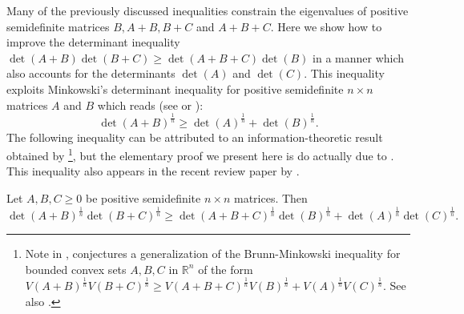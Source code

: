 \documentclass[notitlepage, 10pt]{article}
\begin{document}
Many of the previously discussed inequalities constrain the eigenvalues of positive semidefinite matrices $B, A+B, B+C$ and $A+B+C$.
Here we show how to improve the determinant inequality $\det(A+B)\det(B+C) \geq \det(A+B+C)\det(B)$ in a manner which also accounts for the determinants $\det(A)$ and $\det(C)$.
This inequality exploits Minkowski's determinant inequality for positive semidefinite $n\times n$ matrices $A$ and $B$ which reads (see \cite[Theorem 7.8.21]{horn1985matrix} or \cite[Equation II.44]{bhatia1997matrix}):
\begin{equation}
    \det(A+B)^{\frac{1}{n}} \geq \det(A)^{\frac{1}{n}} + \det(B)^{\frac{1}{n}}.
\end{equation}
The following inequality can be attributed to an information-theoretic result obtained by \citeauthor{courtade2016strengthening} \cite{courtade2016strengthening}\footnote{Note in \cite{courtade2017concavity}, \citeauthor{courtade2017concavity} conjectures a generalization of the Brunn-Minkowski inequality for bounded convex sets $A,B,C$ in $\mathbb R^{n}$ of the form $V(A+B)^{\frac{1}{n}}V(B+C)^{\frac{1}{n}} \geq V(A+B+C)^{\frac{1}{n}}V(B)^{\frac{1}{n}} + V(A)^{\frac{1}{n}}V(C)^{\frac{1}{n}}$. See also \cite{costa1984similarity}.}, but the elementary proof we present here is do actually due to \citeauthor{sra2016reverse} \cite{sra2016reverse}.
This inequality also appears in the recent review paper by \citeauthor{niculescu2023functions} \cite[Section 6.2]{niculescu2023functions}.
\begin{prop}
    \label{prop:cs_ineq}
    Let $A,B,C \geq 0$ be positive semidefinite $n\times n$ matrices.
    Then
    \begin{equation}
        \label{eq:cs_ineq}
        \det (A+B)^{\frac1n} \det (B+C)^{\frac1n} \geq \det (A+B+C)^{\frac1n}\det (B)^{\frac1n} + \det (A)^{\frac1n} \det(C)^{\frac1n}.
    \end{equation}
\end{prop}
\end{document}
